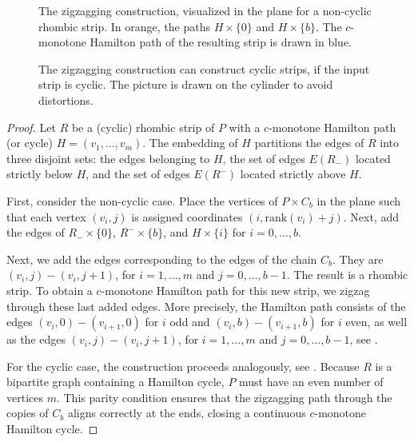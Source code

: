 \documentclass[fontsize=11pt,a4paper,DIV=12]{scrartcl}
\begin{document}
\begin{figure}[!ht]
	\centering
	
	\caption{The zigzagging construction, visualized in the plane for a non-cyclic rhombic strip. In orange, the paths $H\times\{0\}$ and $H\times\{b\}$. The $c$-monotone Hamilton path of the resulting strip is drawn in blue.}
	\label{fig:zigzagging}
\end{figure}

\begin{figure}[!ht]
	\centering
	
	\caption{The zigzagging construction can construct cyclic strips, if the input strip is cyclic. The picture is drawn on the cylinder to avoid distortions.}
	\label{fig:cylinder}
\end{figure}

\zigzagging*
\begin{proof}
	Let $R$ be a (cyclic) rhombic strip of $P$ with a $c$-monotone Hamilton path (or cycle) $H=(v_1, \ldots, v_m)$. The embedding of $H$ partitions the edges of $R$ into three disjoint sets: the edges belonging to $H$, the set of edges $E(R_-)$ located strictly below $H$, and the set of edges $E(R^-)$ located strictly above $H$.

	First, consider the non-cyclic case. Place the vertices of $P\times C_b$ in the plane such that each vertex $(v_i,j)$ is assigned coordinates $(i, \text{rank}(v_i)+j)$. Next, add the edges of $R_-\times\{0\}$, $R^-\times\{b\}$, and $H\times\{i\}$ for $i=0,\ldots,b$.

	Next, we add the edges corresponding to the edges of the chain $C_b$. They are $(v_i,j)-(v_i,j+1)$, for $i=1,\ldots,m$ and $j=0,\ldots,b-1$. The result is a rhombic strip. To obtain a $c$-monotone Hamilton path for this new strip, we zigzag through these last added edges. More precisely, the Hamilton path consists of the edges $(v_i,0)-(v_{i+1},0)$ for $i$ odd and $(v_i,b)-(v_{i+1},b)$ for $i$ even, as well as the edges $(v_i,j)-(v_i,j+1)$, for $i=1,\ldots,m$ and $j=0,\ldots,b-1$, see .

	For the cyclic case, the construction proceeds analogously, see . Because $R$ is a bipartite graph containing a Hamilton cycle, $P$ must have an even number of vertices $m$. This parity condition ensures that the zigzagging path through the copies of $C_b$ aligns correctly at the ends, closing a continuous $c$-monotone Hamilton cycle.
\end{proof}
\end{document}

